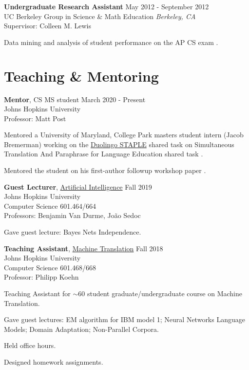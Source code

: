\documentclass[margin,line,hyperref,color]{res}
\newcounter{shared-enum}
\newenvironment{packed_itemize}{
\begin{itemize}[leftmargin=1.5em]
  \setlength{\itemsep}{0pt}
  \setlength{\parskip}{0pt}
  \setlength{\parsep}{0pt}
}{\end{itemize}}
\begin{document}
\begin{resume}
\textbf{Undergraduate Research Assistant} \hfill May 2012 - September 2012\\
UC Berkeley Group in Science \& Math Education    \hfill \textit{Berkeley, CA}\\
Supervisor: Colleen M. Lewis
\begin{packed_itemize}
\item Data mining and analysis of student performance on the AP CS exam
\citep{Lewis+2013ICER}.
\end{packed_itemize}


\section{\sc Teaching \& Mentoring}
\textbf{Mentor},  CS MS student 
  \hfill March 2020 - Present \\
  Johns Hopkins University\\
  Professor: Matt Post
   \begin{packed_itemize}
\item Mentored a University of Maryland, College Park  masters student intern (Jacob Bremerman) working on the \href{https://sharedtask.duolingo.com/}{Duolingo STAPLE} shared task on Simultaneous Translation And Paraphrase for Language Education shared task \citep{khayrallah-etal-2020-jhu}.
\item Mentored the student on his first-author followup workshop paper \citep{bremerman-etal-2020-evaluation}. 
 \end{packed_itemize}

\textbf{Guest Lecturer}, \href{http://www.cs.jhu.edu/~huda/classes/AIFall2018.pdf}{Artificial Intelligence}
  \hfill Fall 2019\\
  Johns Hopkins University\\
   Computer Science 601.464/664\\
  Professors: Benjamin Van Durme, Jo\~ao Sedoc
    \begin{packed_itemize}
\item Gave guest lecture: Bayes Nets Independence.
\end{packed_itemize}

\textbf{Teaching Assistant}, \href{http://mt-class.org/jhu/}{Machine Translation}
  \hfill Fall 2018\\
  Johns Hopkins University\\
   Computer Science 601.468/668\\
  Professor: Philipp Koehn
  \begin{packed_itemize}
\item Teaching Assistant for $\sim$60 student graduate/undergraduate course on Machine Translation. 
\item Gave guest lectures: EM algorithm for IBM model 1; Neural Networks Language Models; Domain Adaptation;  Non-Parallel Corpora.
\item Held office hours.
\item Designed homework assignments.
\end{packed_itemize}


\end{resume}
\end{document}

